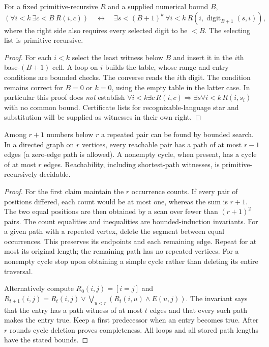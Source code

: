 \begin{lemma}\label{base:collection}
For a fixed primitive-recursive $R$ and a supplied numerical bound $B$,
\[
 (\forall i<k\ \exists c<B\ R(i,c))
 \quad\longleftrightarrow\quad
 \exists s<(B+1)^k\ \forall i<k\ R(i,\operatorname{digit}_{B+1}(s,i)),
\]
where the right side also requires every selected digit to be $<B$.
The selecting list is primitive recursive.
\end{lemma}
\begin{proof}
For each $i<k$ select the least witness below $B$ and insert it in the
$i$th base-$(B+1)$ cell. A loop on $i$ builds the table, whose range and
entry conditions are bounded checks. The converse reads the $i$th digit.
The condition remains correct for $B=0$ or $k=0$, using the empty table in
the latter case. In particular this proof does \emph{not} establish
$\forall i<k\exists c\,R(i,c)\Rightarrow\exists s\forall i<k\,R(i,s_i)$
with no common bound. Certificate lists for recognizable-language star
and substitution will be supplied as witnesses in their own right.
\end{proof}

\begin{lemma}
\label{base:graph}
Among $r+1$ numbers below $r$ a repeated pair can be found by bounded
search. In a directed graph on $r$ vertices, every reachable pair has a
path of at most $r-1$ edges (a zero-edge path is allowed). A nonempty
cycle, when present, has a cycle of at most $r$ edges. Reachability,
including shortest-path witnesses, is primitive-recursively decidable.
\end{lemma}
\begin{proof}
For the first claim maintain the $r$ occurrence counts. If every pair of
positions differed, each count would be at most one, whereas the sum is
$r+1$. The two equal positions are then obtained by a scan over fewer than
$(r+1)^2$ pairs. The count equalities and inequalities are bounded-induction
invariants. For a given path with a repeated vertex, delete the segment
between equal occurrences. This preserves its endpoints and each remaining
edge. Repeat for at most its original length; the remaining path has no
repeated vertices. For a nonempty cycle stop upon obtaining a simple cycle
rather than deleting its entire traversal.

Alternatively compute $R_0(i,j)=[i=j]$ and
$R_{t+1}(i,j)=R_t(i,j)\lor\bigvee_{u<r}(R_t(i,u)\land E(u,j))$.
The invariant says that the entry has a path witness of at most $t$ edges
and that every such path makes the entry true. Keep a first predecessor
when an entry becomes true. After $r$ rounds cycle deletion proves
completeness. All loops and all stored path lengths have the stated bounds.
\end{proof}

